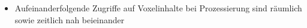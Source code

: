 \documentclass[presentation]{beamer}
\begin{document}
\begin{frame}
	\begin{itemize}
		\item Aufeinanderfolgende Zugriffe auf Voxelinhalte bei Prozessierung sind räumlich sowie zeitlich nah beieinander 
	\end{itemize}

\end{frame}
\end{document}
